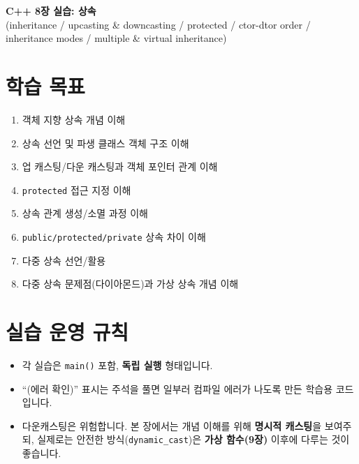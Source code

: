 \documentclass[11pt,a4paper]{article}
\begin{document}
\begin{center}
  {\LARGE \textbf{C++ 8장 실습: 상속}}\\
  \vspace{6pt}
  {\large (inheritance / upcasting \& downcasting / protected / ctor-dtor order / inheritance modes / multiple \& virtual inheritance)}
\end{center}

\vspace{8pt}

\section*{학습 목표}
\begin{GoalBox}
\begin{enumerate}[leftmargin=18pt]
  \item 객체 지향 상속 개념 이해
  \item 상속 선언 및 파생 클래스 객체 구조 이해
  \item 업 캐스팅/다운 캐스팅과 객체 포인터 관계 이해
  \item \texttt{protected} 접근 지정 이해
  \item 상속 관계 생성/소멸 과정 이해
  \item \texttt{public/protected/private} 상속 차이 이해
  \item 다중 상속 선언/활용
  \item 다중 상속 문제점(다이아몬드)과 가상 상속 개념 이해
\end{enumerate}
\end{GoalBox}

\section*{실습 운영 규칙}
\begin{itemize}[leftmargin=18pt]
  \item 각 실습은 \texttt{main()} 포함, \textbf{독립 실행} 형태입니다.
  \item ``(에러 확인)'' 표시는 주석을 풀면 일부러 컴파일 에러가 나도록 만든 학습용 코드입니다.
  \item 다운캐스팅은 위험합니다. 본 장에서는 개념 이해를 위해 \textbf{명시적 캐스팅}을 보여주되, 실제로는 안전한 방식(\texttt{dynamic\_cast})은 \textbf{가상 함수(9장)} 이후에 다루는 것이 좋습니다.
\end{itemize}

\tableofcontents
\newpage
\end{document}
